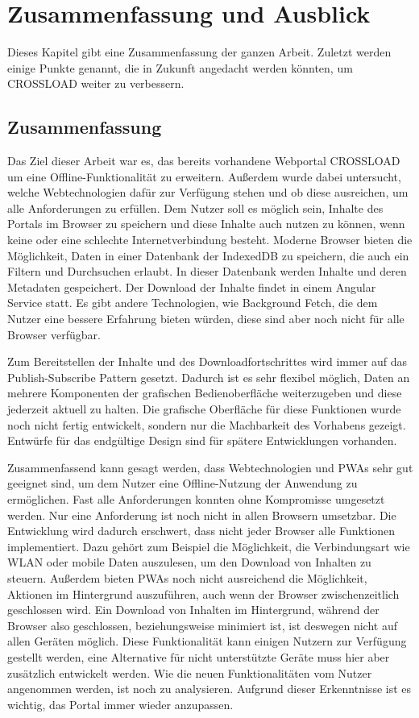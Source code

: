 \chapter{Zusammenfassung und Ausblick}
\label{Kap7}
Dieses Kapitel gibt eine Zusammenfassung der ganzen Arbeit. Zuletzt werden einige Punkte genannt, die in Zukunft angedacht werden könnten, um CROSSLOAD weiter zu verbessern.

\section{Zusammenfassung}
Das Ziel dieser Arbeit war es, das bereits vorhandene Webportal CROSSLOAD um eine Offline-Funktionalität zu erweitern. Außerdem wurde dabei untersucht, welche Webtechnologien dafür zur Verfügung stehen und ob diese ausreichen, um alle Anforderungen zu erfüllen. Dem Nutzer soll es möglich sein, Inhalte des Portals im Browser zu speichern und diese Inhalte auch nutzen zu können, wenn keine oder eine schlechte Internetverbindung besteht. Moderne Browser bieten die Möglichkeit, Daten in einer Datenbank der IndexedDB zu speichern, die auch ein Filtern und Durchsuchen erlaubt. In dieser Datenbank werden Inhalte und deren Metadaten gespeichert. Der Download der Inhalte findet in einem Angular Service statt. Es gibt andere Technologien, wie Background Fetch, die dem Nutzer eine bessere Erfahrung bieten würden, diese sind aber noch nicht für alle Browser verfügbar. 

Zum Bereitstellen der Inhalte und des Downloadfortschrittes wird immer auf das Publish-Subscribe Pattern gesetzt. Dadurch ist es sehr flexibel möglich, Daten an mehrere Komponenten der grafischen Bedienoberfläche weiterzugeben und diese jederzeit aktuell zu halten. Die grafische Oberfläche für diese Funktionen wurde noch nicht fertig entwickelt, sondern nur die Machbarkeit des Vorhabens gezeigt. Entwürfe für das endgültige Design sind für spätere Entwicklungen vorhanden. 

Zusammenfassend kann gesagt werden, dass Webtechnologien und \acp{PWA} sehr gut geeignet sind, um dem Nutzer eine Offline-Nutzung der Anwendung zu ermöglichen. Fast alle Anforderungen konnten ohne Kompromisse umgesetzt werden. Nur eine Anforderung ist noch nicht in allen Browsern umsetzbar. Die Entwicklung wird dadurch erschwert, dass nicht jeder Browser alle Funktionen implementiert. Dazu gehört zum Beispiel die Möglichkeit, die Verbindungsart wie WLAN oder mobile Daten auszulesen, um den Download von Inhalten zu steuern. Außerdem bieten \acp{PWA} noch nicht ausreichend die Möglichkeit, Aktionen im Hintergrund auszuführen, auch wenn der Browser zwischenzeitlich geschlossen wird. Ein Download von Inhalten im Hintergrund, während der Browser also geschlossen, beziehungsweise minimiert ist, ist deswegen nicht auf allen Geräten möglich. Diese Funktionalität kann einigen Nutzern zur Verfügung gestellt werden, eine Alternative für nicht unterstützte Geräte muss hier aber zusätzlich entwickelt werden. Wie die neuen Funktionalitäten vom Nutzer angenommen werden, ist noch zu analysieren. Aufgrund dieser Erkenntnisse ist es wichtig, das Portal immer wieder anzupassen.

